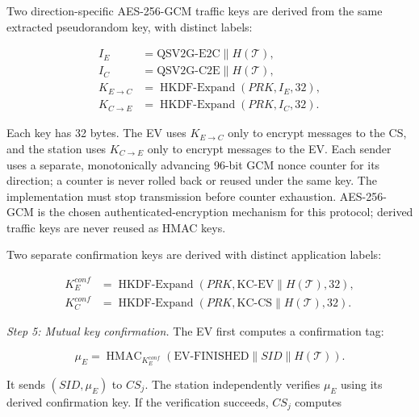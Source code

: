 \documentclass[twocolumn,10pt,journal]{IEEEtran}
\begin{document}
Two direction-specific AES-256-GCM traffic keys are derived
from the same extracted pseudorandom key, with distinct labels:

\begin{equation}
\begin{aligned}
I_E &=\mathrm{QSV2G\mbox{-}E2C}\parallel H(\mathcal T),\\
I_C &=\mathrm{QSV2G\mbox{-}C2E}\parallel H(\mathcal T),\\
K_{E\to C}&=\operatorname{HKDF\mbox{-}Expand}(PRK,I_E,32),\\
K_{C\to E}&=\operatorname{HKDF\mbox{-}Expand}(PRK,I_C,32).
\end{aligned}
\label{eq:qsv2g_session_key}
\end{equation}

Each key has 32 bytes. The EV uses $K_{E\to C}$ only to
encrypt messages to the CS, and the station uses $K_{C\to E}$
only to encrypt messages to the EV. Each sender uses a separate,
monotonically advancing 96-bit GCM nonce counter for its direction;
a counter is never rolled back or reused under the same key. The
implementation must stop transmission before counter exhaustion.
AES-256-GCM is the chosen authenticated-encryption mechanism for
this protocol; derived traffic keys are never reused as HMAC keys.

Two separate confirmation keys are derived
with distinct application labels:

\begin{equation}
\begin{aligned}
K_E^{conf}
&=\operatorname{HKDF\mbox{-}Expand}
\left(PRK,\mathrm{KC\mbox{-}EV}
\parallel H(\mathcal{T}),32\right),\\
K_C^{conf}
&=\operatorname{HKDF\mbox{-}Expand}
\left(PRK,\mathrm{KC\mbox{-}CS}
\parallel H(\mathcal{T}),32\right).
\end{aligned}
\label{eq:qsv2g_confirmation_keys}
\end{equation}

\textit{Step 5: Mutual key confirmation.}
The EV first computes a confirmation tag:

\begin{equation}
\mu_E=
\operatorname{HMAC}_{K_E^{conf}}
\left(
\mathrm{EV\mbox{-}FINISHED}
\parallel SID\parallel H(\mathcal{T})
\right).
\label{eq:qsv2g_ev_finished}
\end{equation}

It sends $(SID,\mu_E)$ to $CS_j$.
The station independently verifies $\mu_E$
using its derived confirmation key. If the
verification succeeds, $CS_j$ computes
\end{document}
